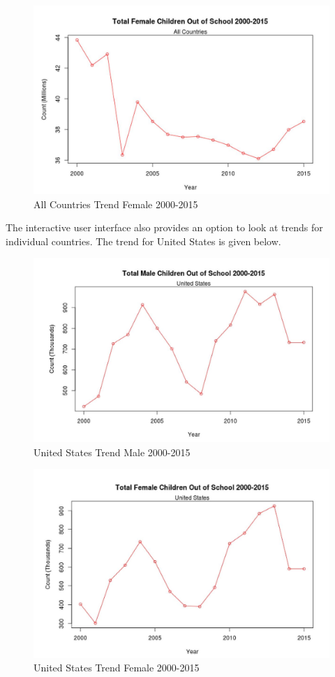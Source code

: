 \documentclass{article}
\begin{document}
\begin{figure}[H]
  \centering
    \includegraphics[scale=0.9]{FemaleTrendAll}
  \caption{All Countries Trend Female 2000-2015}
\end{figure}

The interactive user interface also provides an option to look at trends for individual countries. The trend for United States is given below.

\begin{figure}[H]
  \centering
    \includegraphics[scale=0.9]{MaleTrendUS}
  \caption{United States Trend Male 2000-2015}
\end{figure}

\begin{figure}[H]
  \centering
    \includegraphics[scale=0.9]{FemaleTrendUS}
  \caption{United States Trend Female 2000-2015}
\end{figure}
\end{document}
